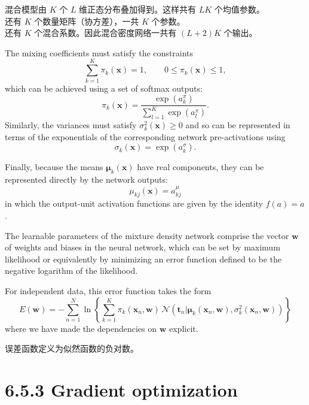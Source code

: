 \documentclass{article}
\begin{document}
{\color{red}
混合模型由 $K$ 个 $L$ 维正态分布叠加得到。这样共有 $LK$ 个均值参数。\\
还有 $K$ 个数量矩阵（协方差），一共 $K$ 个参数。\\
还有 $K$ 个混合系数。因此混合密度网络一共有 $(L+2)K$ 个输出。
}

The mixing coefficients must satisfy the constraints
\begin{equation}
\sum_{k=1}^{K} \pi_k(\mathbf{x}) = 1, \qquad 0 \leqslant \pi_k(\mathbf{x}) \leqslant 1,
\tag{6.39}
\end{equation}
which can be achieved using a set of softmax outputs:
\begin{equation}
\pi_k(\mathbf{x}) = \frac{\exp(a_k^\pi)}{\sum_{l=1}^{K} \exp(a_l^\pi)}.
\tag{6.40}
\end{equation}
Similarly, the variances must satisfy $\sigma_k^2(\mathbf{x}) \geqslant 0$ and so can be represented in terms of the exponentials of the corresponding network pre-activations using
\begin{equation}
\sigma_k(\mathbf{x}) = \exp(a_k^\sigma).
\tag{6.41}
\end{equation}

Finally, because the means $\boldsymbol{\mu}_k(\mathbf{x})$ have real components, they can be represented directly by the network outputs:
\begin{equation}
\mu_{kj}(\mathbf{x}) = a_{kj}^\mu
\tag{6.42}
\end{equation}
in which the output-unit activation functions are given by the identity $f(a)=a$.

The learnable parameters of the mixture density network comprise the vector $\mathbf{w}$ of weights and biases in the neural network, which can be set by maximum likelihood or equivalently by minimizing an error function defined to be the negative logarithm of the likelihood. 

For independent data, this error function takes the form
\begin{equation}
E(\mathbf{w}) = -\sum_{n=1}^{N} \ln \left\{ \sum_{k=1}^{K} \pi_k(\mathbf{x}_n,\mathbf{w}) \,\mathcal{N}\left(\mathbf{t}_n \big| \boldsymbol{\mu}_k(\mathbf{x}_n,\mathbf{w}), \sigma_k^2(\mathbf{x}_n,\mathbf{w}) \right) \right\}
\tag{6.43}
\end{equation}
where we have made the dependencies on $\mathbf{w}$ explicit.

{\color{red}
误差函数定义为似然函数的负对数。
}

\section{6.5.3 Gradient optimization}
\end{document}

